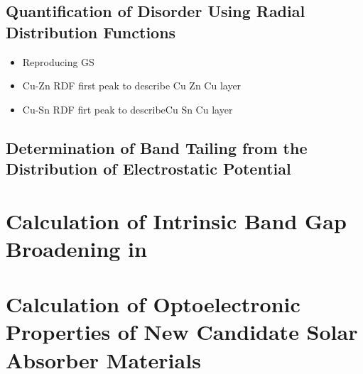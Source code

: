 \subsection{Quantification of Disorder Using Radial Distribution Functions}
\begin{itemize}
\item Reproducing GS
\item Cu-Zn RDF first peak to describe Cu Zn Cu layer
\item Cu-Sn RDF firt peak to describeCu Sn Cu layer
\end{itemize}


\subsection{Determination of Band Tailing from the Distribution of Electrostatic Potential}


\section{Calculation of Intrinsic Band Gap Broadening in \CZTS}


\section{Calculation of Optoelectronic Properties of New Candidate Solar Absorber Materials}

                            